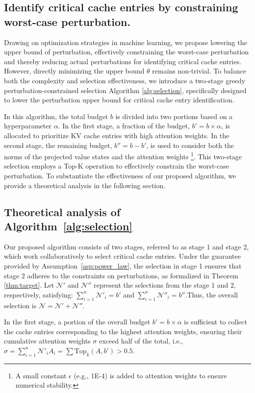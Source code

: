 \subsection{Identify critical cache entries by constraining worst-case perturbation.}

\label{sc:alg}
Drawing on optimization strategies in machine learning,  we propose lowering the upper bound of perturbation, effectively constraining the worst-case perturbation and thereby reducing actual perturbations for identifying critical cache entries.
However, directly minimizing the upper bound $\theta$ remains non-trivial.
 To balance both the complexity and selection effectiveness, we introduce a two-stage greedy perturbation-constrained selection Algorithm \ref{alg:selection}, specifically designed to lower the perturbation upper bound for critical cache entry identification.

In this algorithm, the total budget \(b\) is divided into two portions based on a hyperparameter \(\alpha\). In the first stage, a fraction of the budget, \(b' = b \times \alpha\), is allocated to prioritize KV cache entries with high attention weights. In the second stage, the remaining budget, \(b'' = b-b'\), is used to consider both the norms of the projected value states and the attention weights \footnote{A small constant $\epsilon$ (e.g., 1E-4) is added to attention weights to ensure numerical stability.}. This two-stage selection employs a Top-K operation to effectively constrain the worst-case perturbation. To substantiate the effectiveness of our proposed algorithm, we provide a theoretical analysis in the following section.

\subsection{Theoretical analysis of Algorithm~\ref{alg:selection}}
\label{sc:alg_analy}

Our proposed algorithm consists of two stages, referred to as stage 1 and stage 2, which work collaboratively to select critical cache entries.  Under the guarantee provided by Assumption~\ref{asp:power_law}, the selection in stage 1 ensures that stage 2 adheres to the constraints on perturbations, as formalized in Theorem \ref{thm:target}. Let  $\mathcal{N}'$ and $\mathcal{N}''$	represent the selections from the stage 1 and 2, respectively, satisfying: $\sum\nolimits_{i=1}^{n} \mathcal{N}'_i =b'$ and  $\sum\nolimits_{i=1}^{n} \mathcal{N}''_i =b''$.Thus,  the overall selection is $\mathcal{N} = \mathcal{N}' +  \mathcal{N}''$.
\begin{assumption}
	\label{asp:power_law}
	In the first stage, a portion of the overall budget $b' =  b \times \alpha$ is sufficient to collect the cache entries corresponding to the highest attention weights, ensuring their cumulative attention weights $\sigma $ exceed half of the total, i.e., $ \sigma =\sum\nolimits_{i=1}^{n}  \mathcal{N}'_i A_i = \sum \text{Top}_k(A,  b') > 0.5$.
\end{assumption}



